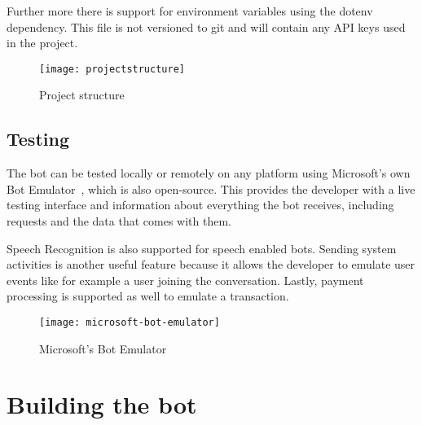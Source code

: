 Further more there is support for environment variables using the dotenv dependency. This file is not versioned to git and will contain any API keys used in the project.

\begin{figure}[ht]
	\centering
	\texttt{[image: projectstructure]}\label{fig:projectstructure}
	\caption{Project structure}
\end{figure}

\subsection{Testing}

The bot can be tested locally or remotely on any platform using Microsoft's own Bot Emulator~\cite{microsoft-bot-emulator}, which is also open-source. This provides the developer with a live testing interface and information about everything the bot receives, including requests and the data that comes with them.

Speech Recognition is also supported for speech enabled bots. Sending system activities is another useful feature because it allows the developer to emulate user events like for example a user joining the conversation. Lastly, payment processing is supported as well to emulate a transaction.

\begin{figure}[ht]
	\centering
	\texttt{[image: microsoft-bot-emulator]}\label{fig:microsoft-azure-calculator-screen}
	\caption{Microsoft's Bot Emulator~\cite{microsoft-bot-emulator}}
\end{figure}

\section{Building the bot}

